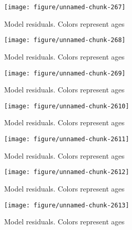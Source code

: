 \documentclass[a4paper]{article}\usepackage{graphicx, color}
\makeatletter
\def\maxwidth{ %
  \ifdim\Gin@nat@width>\linewidth
    \linewidth
  \else
    \Gin@nat@width
  \fi
}
\newenvironment{knitrout}{}{} %
\makeatother
\begin{document}
\begin{knitrout}
\begin{figure}[H]
{\centering \texttt{[image: figure/unnamed-chunk-267]} 

}

\caption[Model residuals]{Model residuals. Colors represent ages\label{fig:unnamed-chunk-267}}
\end{figure}
\begin{figure}[H]


{\centering \texttt{[image: figure/unnamed-chunk-268]} 

}

\caption[Model residuals]{Model residuals. Colors represent ages\label{fig:unnamed-chunk-268}}
\end{figure}
\begin{figure}[H]


{\centering \texttt{[image: figure/unnamed-chunk-269]} 

}

\caption[Model residuals]{Model residuals. Colors represent ages\label{fig:unnamed-chunk-269}}
\end{figure}
\begin{figure}[H]


{\centering \texttt{[image: figure/unnamed-chunk-2610]} 

}

\caption[Model residuals]{Model residuals. Colors represent ages\label{fig:unnamed-chunk-2610}}
\end{figure}
\begin{figure}[H]


{\centering \texttt{[image: figure/unnamed-chunk-2611]} 

}

\caption[Model residuals]{Model residuals. Colors represent ages\label{fig:unnamed-chunk-2611}}
\end{figure}
\begin{figure}[H]


{\centering \texttt{[image: figure/unnamed-chunk-2612]} 

}

\caption[Model residuals]{Model residuals. Colors represent ages\label{fig:unnamed-chunk-2612}}
\end{figure}
\begin{figure}[H]


{\centering \texttt{[image: figure/unnamed-chunk-2613]} 

}

\caption[Model residuals]{Model residuals. Colors represent ages\label{fig:unnamed-chunk-2613}}
\end{figure}
\begin{figure}[H]



\end{figure}
\end{knitrout}
\end{document}
